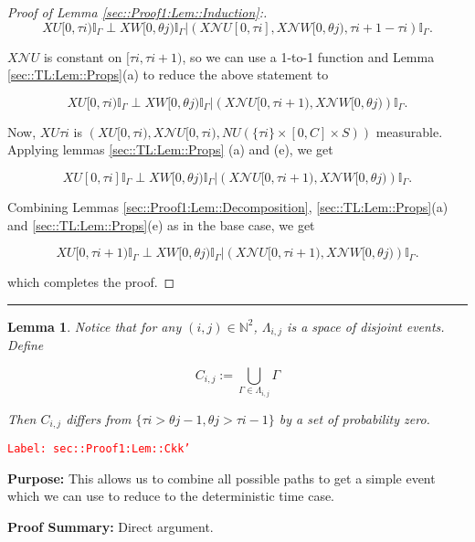 \documentclass[12pt]{article}
\newcommand{\mb}{\mathbb}
\newcommand{\mc}{\mathcal}
\newcommand{\tr}{\textcolor{red}}
\newcommand{\labe}[1]{\tr{\texttt{Label: #1}}}
\newcommand{\purpose}{\textbf{Purpose: }}
\newcommand{\pfsum}{\textbf{Proof Summary: }}
\newcommand{\lin}{\rule{\linewidth}{0.4 pt}}
\renewcommand{\U}{U}							%
\newcommand{\UU}{W}								%
\renewcommand{\S}{S}							%
\newcommand{\X}{X}								%
\newcommand{\neigh}{\mc{N}}						%
\newcommand{\const}{C}							%
\newcommand{\poiss}{N}							%
\newcommand{\rt}{\tau}							%
\newcommand{\rtt}{\theta}						%
\newcommand{\apath}{\Gamma}						%
\newcommand{\pathset}[2]{\Lambda_{#1,#2}}		%
\newcommand{\pathsete}[2]{C_{#1,#2}}			%
\newtheorem{lem}[thms]{Lemma}
\begin{document}
\begin{proof}[Proof of Lemma \ref{sec::Proof1:Lem::Induction}:]
\[\X{\U}{[0,\rt{i})}\mb{I}_{\apath}\perp \X{\UU}{[0,\rtt{j})}\mb{I}_{\apath}|\left(\X{\neigh{\U}}{[0,\rt{i}]},\X{\neigh{\UU}}{[0,\rtt{j})},\rt{i+1} - \rt{i}\right)\mb{I}_{\apath}.\]

\(\X{\neigh{\U}}{}\) is constant on \([\rt{i},\rt{i+1})\), so we can use a 1-to-1 function and Lemma \ref{sec::TL:Lem::Props}(a) to reduce the above statement to

\[\X{\U}{[0,\rt{i})}\mb{I}_{\apath}\perp \X{\UU}{[0,\rtt{j})}\mb{I}_{\apath}|\left(\X{\neigh{\U}}{[0,\rt{i+1})},\X{\neigh{\UU}}{[0,\rtt{j})}\right)\mb{I}_{\apath}.\]

Now, \(\X{\U}{\rt{i}}\) is \(\left(\X{\U}{[0,\rt{i})}, \X{\neigh{\U}}{[0,\rt{i})}, \poiss{\U}(\{\rt{i}\}\times [0,\const{}]\times\S)\right)\) measurable. Applying lemmas \ref{sec::TL:Lem::Props} (a) and (e), we get

\[\X{\U}{[0,\rt{i}]}\mb{I}_{\apath}\perp \X{\UU}{[0,\rtt{j})}\mb{I}_{\apath}|\left(\X{\neigh{\U}}{[0,\rt{i+1})},\X{\neigh{\UU}}{[0,\rtt{j})}\right)\mb{I}_{\apath}.\]

Combining Lemmas \ref{sec::Proof1:Lem::Decomposition}, \ref{sec::TL:Lem::Props}(a) and \ref{sec::TL:Lem::Props}(e) as in the base case, we get

\[\X{\U}{[0,\rt{i+1})}\mb{I}_{\apath}\perp \X{\UU}{[0,\rtt{j})}\mb{I}_{\apath}|\left(\X{\neigh{\U}}{[0,\rt{i+1})},\X{\neigh{\UU}}{[0,\rtt{j})}\right)\mb{I}_{\apath}.\]

which completes the proof.
\end{proof}

\lin

\begin{lem}
Notice that for any \((i,j) \in \mb{N}^2\), \(\pathset{i}{j}\) is a space of disjoint events. Define

\[\pathsete{i}{j} := \bigcup_{\apath\in\pathset{i}{j}} \apath\]

Then \(\pathsete{i}{j}\) differs from \(\{\rt{i} > \rtt{j-1}, \rtt{j} > \rt{i-1}\}\) by a set of probability zero.
\label{sec::Proof1:Lem::Ckk'}
\end{lem}
\labe{sec::Proof1:Lem::Ckk'}

\purpose This allows us to combine all possible paths to get a simple event which we can use to reduce to the deterministic time case.

\pfsum Direct argument.
\end{document}
